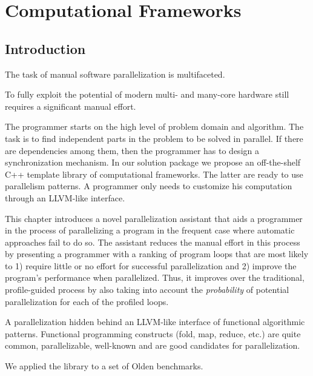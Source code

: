 \chapter{Computational Frameworks}
\label{computational_frameworks}

\section{Introduction}
\label{computational_frameworks_introduction}

\quad The task of manual software parallelization is multifaceted. 

To fully exploit the potential of modern multi- and many-core hardware still requires a significant manual effort.


\quad The programmer starts on the high level of problem domain and algorithm. The task is to find independent parts in the problem to be solved in parallel. If there are dependencies among them, then the programmer has to design a synchronization mechanism. In our solution package we propose an off-the-shelf C++ template library of computational frameworks. The latter are ready to use parallelism patterns. A programmer only needs to customize his computation through an LLVM-like interface.

This chapter introduces a novel parallelization assistant that aids a programmer in the process of parallelizing a program in the frequent case where automatic approaches fail to do so.
%
The assistant reduces the manual effort in this process by presenting a programmer with a ranking of program loops that are most likely to 1) require little or no effort for successful parallelization and 2) improve the program's performance when parallelized.
%
Thus, it improves over the traditional, profile-guided process by also taking into account the \emph{probability} of potential parallelization for each of the profiled loops.


A parallelization hidden behind an LLVM-like interface of functional algorithmic patterns. 
%
Functional programming constructs (fold, map, reduce, etc.) are quite common, parallelizable, well-known and are good candidates for parallelization.

We applied the library to a set of Olden benchmarks.

